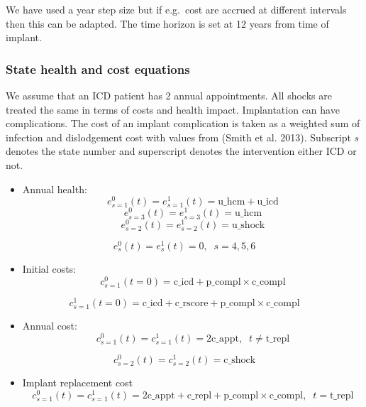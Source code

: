 \documentclass[
]{article}
\providecommand{\tightlist}{%
  \setlength{\itemsep}{0pt}\setlength{\parskip}{0pt}}
\begin{document}
We have used a year step size but if e.g.~cost are accrued at different intervals then this can be adapted.
The time horizon is set at 12 years from time of implant.

\hypertarget{state-health-and-cost-equations}{%
\subsubsection{State health and cost equations}\label{state-health-and-cost-equations}}

We assume that an ICD patient has 2 annual appointments.
All shocks are treated the same in terms of costs and health impact.
Implantation can have complications.
The cost of an implant complication is taken as a weighted sum of infection and dislodgement cost with values from (Smith et al. 2013).
Subscript \(s\) denotes the state number and superscript denotes the intervention either ICD or not.

\begin{itemize}
\tightlist
\item
  Annual health: \[
  e^0_{s=1}(t) = e^1_{s=1}(t) = \mbox{u\_hcm} + \mbox{u\_icd}
  \] \[
  e^0_{s=3}(t) = e^1_{s=3}(t) = \mbox{u\_hcm}
  \] \[
  e^0_{s=2}(t) = e^1_{s=2}(t) = \mbox{u\_shock}
  \]
\end{itemize}

\[
e^0_{s}(t) = e^1_{s}(t) = 0, \;\; s = 4,5,6
\]

\begin{itemize}
\tightlist
\item
  Initial costs: \[
  c^0_{s=1}(t = 0) = \mbox{c\_icd} + \mbox{p\_compl} \times \mbox{c\_compl}
  \]
\end{itemize}

\[
c^1_{s=1}(t = 0) = \mbox{c\_icd} + \mbox{c\_rscore} + \mbox{p\_compl} \times \mbox{c\_compl}
\]

\begin{itemize}
\tightlist
\item
  Annual cost: \[
  c^0_{s=1}(t) = c^1_{s=1}(t) = 2 \mbox{c\_appt}, \;\; t \neq \mbox{t\_repl}
  \]
\end{itemize}

\[
c^0_{s=2}(t) = c^1_{s=2}(t) = \mbox{c\_shock}
\]

\begin{itemize}
\tightlist
\item
  Implant replacement cost \[
  c^0_{s=1}(t) = c^1_{s=1}(t) = 2 \mbox{c\_appt} + \mbox{c\_repl} + \mbox{p\_compl} \times \mbox{c\_compl}, \;\;  t = \mbox{t\_repl}
  \]
\end{itemize}
\end{document}
